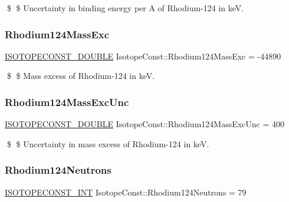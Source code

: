 \$ \$ Uncertainty in binding energy per A of Rhodium-\/124 in keV. \mbox{\label{group___isotope_const-_rhodium-_rh124_ga71862b5be9e9abc39c37077f78baf8e5}} 
\subsubsection{\texorpdfstring{Rhodium124\+Mass\+Exc}{Rhodium124MassExc}}
{\footnotesize\ttfamily \mbox{\hyperlink{group___isotope_const-_macros_ga8f45a7272ce02c0b4c65c44636ed719a}{I\+S\+O\+T\+O\+P\+E\+C\+O\+N\+S\+T\+\_\+\+D\+O\+U\+B\+LE}} Isotope\+Const\+::\+Rhodium124\+Mass\+Exc = -\/44890}

\$ \$ Mass excess of Rhodium-\/124 in keV. \mbox{\label{group___isotope_const-_rhodium-_rh124_ga7a8fd23251a1b2b96271783649d4c378}} 
\subsubsection{\texorpdfstring{Rhodium124\+Mass\+Exc\+Unc}{Rhodium124MassExcUnc}}
{\footnotesize\ttfamily \mbox{\hyperlink{group___isotope_const-_macros_ga8f45a7272ce02c0b4c65c44636ed719a}{I\+S\+O\+T\+O\+P\+E\+C\+O\+N\+S\+T\+\_\+\+D\+O\+U\+B\+LE}} Isotope\+Const\+::\+Rhodium124\+Mass\+Exc\+Unc = 400}

\$ \$ Uncertainty in mass excess of Rhodium-\/124 in keV. \mbox{\label{group___isotope_const-_rhodium-_rh124_ga0125c30f72e4a168e204af81c469f239}} 
\subsubsection{\texorpdfstring{Rhodium124\+Neutrons}{Rhodium124Neutrons}}
{\footnotesize\ttfamily \mbox{\hyperlink{group___isotope_const-_macros_ga5f18360b3e99483a35c32d789e62621c}{I\+S\+O\+T\+O\+P\+E\+C\+O\+N\+S\+T\+\_\+\+I\+NT}} Isotope\+Const\+::\+Rhodium124\+Neutrons = 79}

